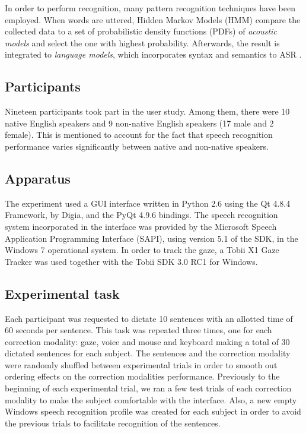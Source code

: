\documentclass[]{article}
\begin{document}
In order to perform recognition, many pattern recognition techniques have been employed. When words are uttered, Hidden
Markov Models (HMM) compare the collected data to a set of probabilistic density functions (PDFs) of \textit{acoustic
models} and select the one with highest probability. Afterwards, the result is integrated to \textit{language models}, which
incorporates syntax and semantics to ASR \cite{Douglas2008}.


\subsection{Participants}
Nineteen participants took part in the user study. Among them, there were 10 native English speakers and 9 non-native
English speakers (17 male and 2 female). This is mentioned to account for the fact that speech recognition performance
varies significantly between native and non-native speakers.


\subsection{Apparatus}
The experiment used a GUI interface written in Python 2.6 using the Qt 4.8.4 Framework, by Digia, and the PyQt 4.9.6
bindings. The speech recognition system incorporated in the interface was provided by the Microsoft Speech Application
Programming Interface (SAPI), using version 5.1 of the SDK, in the Windows 7 operational system. In order to track
the gaze, a Tobii X1 Gaze Tracker was used together with the Tobii SDK 3.0 RC1 for Windows.


\subsection{Experimental task}
Each participant was requested to dictate 10 sentences with an allotted time of 60 seconds per sentence.
This task was repeated three times, one for each correction modality: gaze, voice and mouse and keyboard making a total
of 30 dictated sentences for each subject. The sentences and the correction modality were randomly shuffled between
experimental trials in order to smooth out ordering effects on the correction modalities performance. Previously to the
beginning of each experimental trial, we ran a few test trials of each correction modality to make the
subject comfortable with the interface. Also, a new empty Windows speech recognition profile was created for each subject
in order to avoid the previous trials to facilitate recognition of the sentences.
\end{document}
